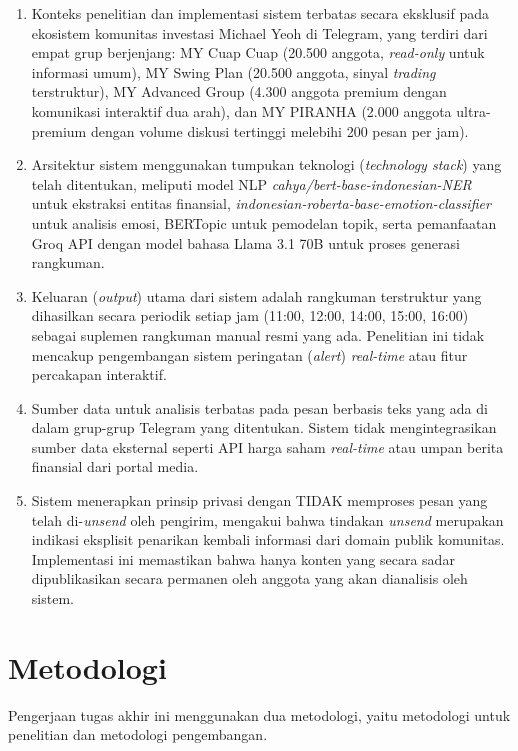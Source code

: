 \begin{enumerate}
\item Konteks penelitian dan implementasi sistem terbatas secara eksklusif pada ekosistem komunitas investasi Michael Yeoh di Telegram, yang terdiri dari empat grup berjenjang: MY Cuap Cuap (20.500 anggota, \textit{read-only} untuk informasi umum), MY Swing Plan (20.500 anggota, sinyal \textit{trading} terstruktur), MY Advanced Group (4.300 anggota premium dengan komunikasi interaktif dua arah), dan MY PIRANHA (2.000 anggota ultra-premium dengan volume diskusi tertinggi melebihi 200 pesan per jam).

\item Arsitektur sistem menggunakan tumpukan teknologi (\textit{technology stack}) yang telah ditentukan, meliputi model NLP \textit{cahya/bert-base-indonesian-NER} untuk ekstraksi entitas finansial, \textit{indonesian-roberta-base-emotion-classifier} untuk analisis emosi, BERTopic untuk pemodelan topik, serta pemanfaatan Groq API dengan model bahasa Llama 3.1 70B untuk proses generasi rangkuman.

\item Keluaran (\textit{output}) utama dari sistem adalah rangkuman terstruktur yang dihasilkan secara periodik setiap jam (11:00, 12:00, 14:00, 15:00, 16:00) sebagai suplemen rangkuman manual resmi yang ada. Penelitian ini tidak mencakup pengembangan sistem peringatan (\textit{alert}) \textit{real-time} atau fitur percakapan interaktif.

\item Sumber data untuk analisis terbatas pada pesan berbasis teks yang ada di dalam grup-grup Telegram yang ditentukan. Sistem tidak mengintegrasikan sumber data eksternal seperti API harga saham \textit{real-time} atau umpan berita finansial dari portal media.

\item Sistem menerapkan prinsip privasi dengan TIDAK memproses pesan yang telah di-\textit{unsend} oleh pengirim, mengakui bahwa tindakan \textit{unsend} merupakan indikasi eksplisit penarikan kembali informasi dari domain publik komunitas. Implementasi ini memastikan bahwa hanya konten yang secara sadar dipublikasikan secara permanen oleh anggota yang akan dianalisis oleh sistem.
\end{enumerate}

\section{Metodologi}
Pengerjaan tugas akhir ini menggunakan dua metodologi, yaitu metodologi untuk penelitian dan metodologi pengembangan.

